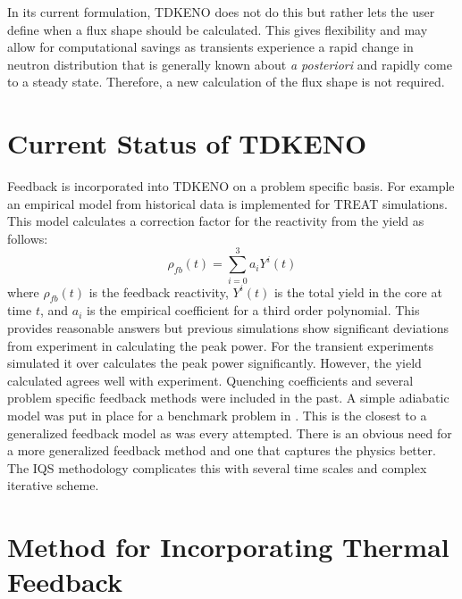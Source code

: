 \documentclass[11pt]{article}
\begin{document}
 In its current formulation, TDKENO does not do this but rather lets the user define when a flux shape should be calculated.  This gives flexibility and may allow for computational savings as transients experience a rapid change in neutron distribution that is generally known about \emph{a posteriori} and rapidly come to a steady state. Therefore, a new calculation of the flux shape is not required.

\section{Current Status of TDKENO}
Feedback is incorporated into TDKENO on a problem specific basis.  For example an empirical model from historical data is implemented for TREAT simulations. This model calculates a correction factor for the reactivity from the yield as follows:
\begin{equation}
    \rho_{fb}(t) = \sum_{i = 0}^{3}a_i Y^i (t)
\end{equation}
where $\rho_{fb}(t)$ is the feedback reactivity, $Y^i (t)$ is the total yield in the core at time $t$, and $a_i$ is the empirical coefficient for a third order polynomial.
  This provides reasonable answers but previous simulations show significant deviations from experiment in calculating the peak power.  For the transient experiments simulated it over calculates the peak power significantly.  However, the yield calculated agrees well with experiment.
Quenching coefficients and several problem specific feedback methods were included in the past.  A simple adiabatic model was put in place for a benchmark problem in \cite{Bentley}.  This is the closest to a generalized feedback model as was every attempted.  There is an obvious need for a more generalized feedback method and one that captures the physics better.  The IQS methodology complicates this with several time scales and complex iterative scheme.  

\section{Method for Incorporating Thermal Feedback}
\end{document}
